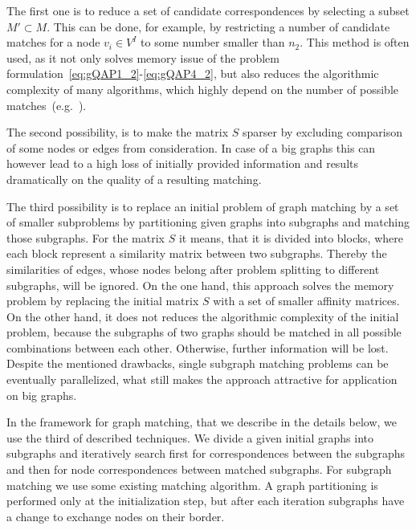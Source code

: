 The first one is to reduce a set of candidate correspondences by selecting a subset $M'\subset M$. This can be done, for example, by restricting a number of candidate matches for a node $v_i\in V^I$ to some number smaller than $n_2$. This method is often used, as it not only solves memory issue of the problem formulation~\eqref{eq:gQAP1_2}-\eqref{eq:gQAP4_2}, but also reduces the algorithmic complexity of many algorithms, which highly depend on the number of possible matches~(e.g.~\cite{Cho2014_Haystack,Cho2010_RRWM,Cho2012_ProgressiveGM, Leordeanu2005_SM}).

The second possibility, is to make the matrix $S$ sparser by excluding comparison of some nodes or edges from consideration. In case of a big graphs this can however lead to a high loss of initially provided information and results dramatically on the quality of a resulting matching. 

The third possibility is to replace an initial problem of graph matching by a set of smaller subproblems by partitioning given graphs into subgraphs and matching those subgraphs. For the matrix $S$ it means, that it is divided into blocks, where each block represent a similarity matrix between two subgraphs. Thereby the similarities of edges, whose nodes belong after problem splitting to different subgraphs, will be ignored. On the one hand, this approach solves the memory problem by replacing the initial matrix $S$ with a set of smaller affinity matrices. On the other hand, it does not reduces the algorithmic complexity of the initial problem, because the subgraphs of two graphs should be matched in all possible combinations between each other. Otherwise, further information will be lost. Despite the mentioned drawbacks, single subgraph matching problems can be eventually parallelized, what still makes the approach attractive for application on big graphs.

In the framework for graph matching, that we describe in the details below, we use the third of described techniques. We divide a given initial graphs into subgraphs and iteratively search first for correspondences between the subgraphs and then for node correspondences between matched subgraphs. For subgraph matching we use some existing matching algorithm. A graph partitioning is performed only at the initialization step, but after each iteration subgraphs have a change to exchange nodes on their border.

